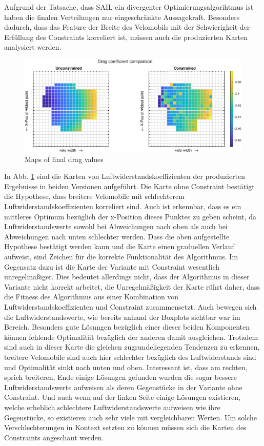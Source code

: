 Aufgrund der Tatsache, dass SAIL ein divergenter Optimierungsalgorihtmus ist haben die finalen Verteilungen nur eingeschränkte Aussagekraft.
Besonders dadurch, dass das Feature der Breite des Velomobils mit der Schwierigkeit der Erfüllung des Constraints korreliert ist, müssen auch die produzierten Karten analysiert werden.

\begin{figure}[h]
	\includegraphics[width=1\linewidth]{bilder/2pt500Samples/dragMapComparison}
	\caption{Maps of final drag values}
	\label{fig:1stmapDrag}
\end{figure}

In Abb. \ref{fig:1stmapDrag} sind die Karten von Luftwiderstandskoeffizienten der produzierten Ergebnisse in beiden Versionen aufgeführt.
Die Karte ohne Constraint bestätigt die Hypothese, dass breitere Velomobile mit schlechterem Luftwiderstandskoeffizienten korreliert sind.
Auch ist erkennbar, dass es ein mittleres Optimum bezüglich der x-Position dieses Punktes zu geben scheint, da Luftwiderstandswerte sowohl bei Abweichungen nach oben als auch bei Abweichungen nach unten schlechter werden.
Dass die oben aufgestellte Hypothese bestätigt werden kann und die Karte einen graduellen Verlauf aufweist, sind Zeichen für die korrekte Funktionalität des Algorithmus.
Im Gegensatz dazu ist die Karte der Variante mit Constraint wesentlich unregelmäßiger.
Dies bedeutet allerdings nicht, dass der Algorithmus in dieser Variante nicht korrekt arbeitet, die Unregelmäßigkeit der Karte rührt daher, dass die Fitness des Algorithmus aus einer Kombination von Luftwiderstandskoeffizienten und Constraint zusammensetzt.
Auch bewegen sich die Luftwiderstandswerte, wie bereits anhand der Boxplots sichtbar war im Bereich.
Besonders gute Lösungen bezüglich einer dieser beiden Komponenten können fehlende Optimalität bezüglich der anderen damit ausgleichen.
Trotzdem sind auch in dieser Karte die gleichen zugrundeliegenden Tendenzen zu erkennen, breitere Velomobile sind auch hier schlechter bezüglich des Luftwiderstands sind und Optimalität sinkt nach unten und oben.
Interessant ist, dass am rechten, sprich breiteren, Ende einige Lösungen gefunden wurden die sogar bessere Luftwiderstandswerte aufweisen als deren Gegenstücke in der Variante ohne Constraint.
Und auch wenn auf der linken Seite einige Lösungen existieren, welche erheblich schlechtere Luftwiderstandswerte aufweisen wie ihre Gegenstücke, so existieren auch sehr viele mit vergleichbaren Werten.
Um solche Verschlechterungen in Kontext setzten zu können müssen sich die Karten des Constraints angeschaut werden.

